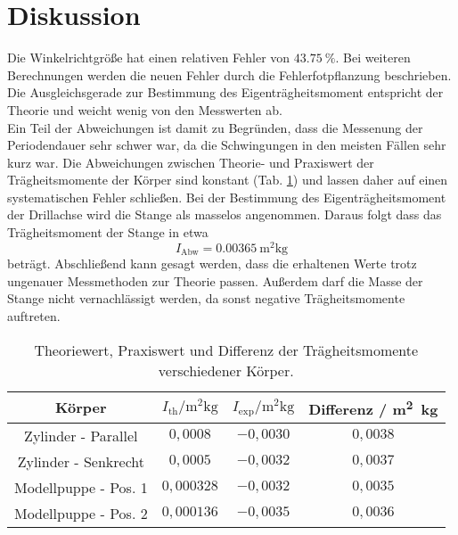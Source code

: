 \section{Diskussion}
\label{sec:Diskussion}
Die Winkelrichtgröße hat einen relativen Fehler von $\SI{43.75}{\%}$.
Bei weiteren Berechnungen werden die neuen Fehler durch die Fehlerfotpflanzung beschrieben.
Die Ausgleichsgerade zur Bestimmung des Eigenträgheitsmoment entspricht der Theorie und weicht wenig von den Messwerten ab.\\
Ein Teil der Abweichungen ist damit zu Begründen, dass die Messenung der Periodendauer sehr schwer war, da die Schwingungen in den meisten Fällen sehr kurz war.
Die Abweichungen zwischen Theorie- und Praxiswert der Trägheitsmomente der Körper sind konstant (Tab. \ref{tab:diff}) und lassen daher auf einen systematischen Fehler schließen.
Bei der Bestimmung des Eigenträgheitsmoment der Drillachse wird die Stange als masselos angenommen.
Daraus folgt dass das Trägheitsmoment der Stange in etwa
\begin{equation}
    I_\text{Abw} = \SI{0.00365}{\meter^2\kg}
\end{equation}
beträgt.
Abschließend kann gesagt werden, dass die erhaltenen Werte trotz ungenauer Messmethoden zur Theorie passen.
Außerdem darf die Masse der Stange nicht vernachlässigt werden, da sonst negative Trägheitsmomente auftreten.
\begin{table}
    \centering
    \begin{tabular}{c|ccc}
    \toprule
    Körper & $I_\text{th} / \si{\metre^2\kg}$ & $I_\text{exp} / \si{\metre^2\kg}$ & Differenz / \si{\metre^2\kg} \\
    \midrule
    Zylinder - Parallel &  $0,0008$ & $−0,0030$ & $0,0038$\\
    Zylinder - Senkrecht & $0,0005$ & $−0,0032$ & $0,0037$\\
    Modellpuppe - Pos. 1 & $0,000328$ & $−0,0032$ & $0,0035$\\
    Modellpuppe - Pos. 2 & $0,000136$ & $−0,0035$ & $0,0036$\\
    \bottomrule
    \end{tabular}
    \caption{Theoriewert, Praxiswert und Differenz der Trägheitsmomente verschiedener Körper.}
    \label{tab:diff}
\end{table}